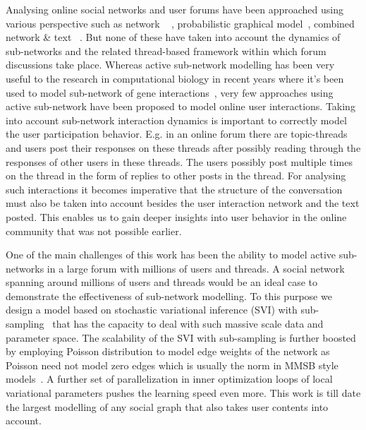 \documentclass{sig-alternate}
\begin{document}
Analysing online social networks and user forums have been approached using
various perspective such as network ~\cite{Shi:2000:NCI:351581.351611,
Shi00learningsegmentation} , probabilistic 
graphical model~\cite{ Airoldi:2008:MMS:1390681.1442798}, 
combined network \& text 
~\cite{Ho:2012:DHT:2187836.2187936,Nallapati:2008:JLT:1401890.1401957}. 
But none of these have taken
into account the dynamics of sub-networks and the related thread-based framework
within which forum discussions take place. Whereas
active sub-network modelling has been very useful to the research in
computational biology in recent years where it's been used to model sub-network of gene
interactions~\cite{journals/ploscb/DeshpandeSVHM10,Lichtenstein:Charleston},
very few approaches using active sub-network have been proposed to model online
 user interactions. Taking into account sub-network interaction
dynamics is important to correctly model the user participation behavior. E.g.
in an online forum there are topic-threads and users post their responses on
these threads after possibly reading through the responses of other users in
these threads. The users possibly post multiple times on the thread in the form
of replies to other posts in the thread. For analysing such interactions it
becomes imperative that the structure of the conversation must also be taken
into account  besides the user interaction network and the
text posted. This enables us to gain deeper insights into user behavior in the
online community that was not possible earlier. 

One of the main challenges of this work has been the ability to model
active sub-networks in a large forum with millions of users and
threads. A social network spanning around millions of users and threads would 
be an ideal case to demonstrate the effectiveness of sub-network
modelling.
To this purpose we design a model based on stochastic variational inference
(SVI) with sub-sampling~\cite{Hoffman:2013:SVI} that has the capacity to deal
with such massive scale data and parameter space. The scalability of the SVI
with sub-sampling is further boosted by employing Poisson distribution 
to model edge weights of
the network as Poisson need not model zero edges which is usually the norm in
MMSB style models~\cite{Airoldi:2008:MMS:1390681.1442798}. A further set of
parallelization in inner optimization loops of local variational parameters
pushes the learning speed even more. This work is till date the largest 
modelling of any social graph that also takes user contents into
account. 
\end{document}
